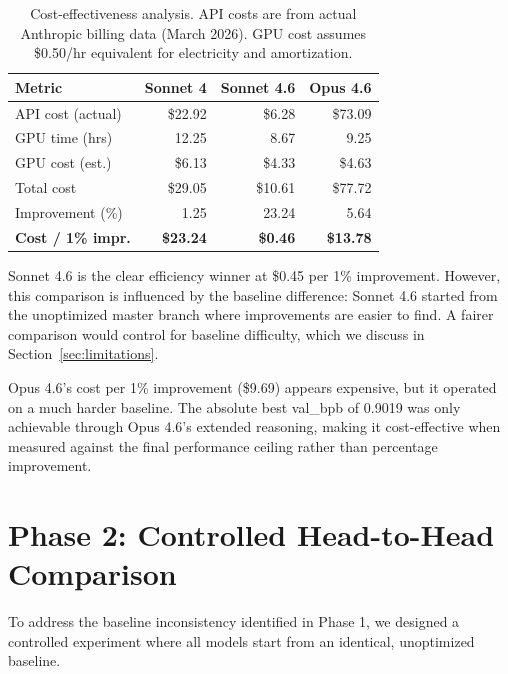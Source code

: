 \documentclass[11pt]{article}
\begin{document}
\begin{table}[H]
\centering
\caption{Cost-effectiveness analysis. API costs are from actual Anthropic billing data (March 2026). GPU cost assumes \$0.50/hr equivalent for electricity and amortization.}
\label{tab:cost}
\begin{tabular}{lrrr}
\toprule
\textbf{Metric} & \textbf{Sonnet 4} & \textbf{Sonnet 4.6} & \textbf{Opus 4.6} \\
\midrule
API cost (actual)    & \$22.92 & \$6.28  & \$73.09  \\
GPU time (hrs)       & 12.25   & 8.67    & 9.25     \\
GPU cost (est.)      & \$6.13  & \$4.33  & \$4.63   \\
Total cost           & \$29.05 & \$10.61 & \$77.72  \\
Improvement (\%)     & 1.25    & 23.24   & 5.64     \\
\textbf{Cost / 1\% impr.} & \textbf{\$23.24} & \textbf{\$0.46}  & \textbf{\$13.78}  \\
\bottomrule
\end{tabular}
\end{table}

Sonnet 4.6 is the clear efficiency winner at \$0.45 per 1\% improvement. However, this comparison is influenced by the baseline difference: Sonnet 4.6 started from the unoptimized master branch where improvements are easier to find. A fairer comparison would control for baseline difficulty, which we discuss in Section~\ref{sec:limitations}.

Opus 4.6's cost per 1\% improvement (\$9.69) appears expensive, but it operated on a much harder baseline. The absolute best val\_bpb of 0.9019 was only achievable through Opus 4.6's extended reasoning, making it cost-effective when measured against the final performance ceiling rather than percentage improvement.

\section{Phase 2: Controlled Head-to-Head Comparison}
\label{sec:phase2}

To address the baseline inconsistency identified in Phase 1, we designed a controlled experiment where all models start from an identical, unoptimized baseline.

\end{document}
